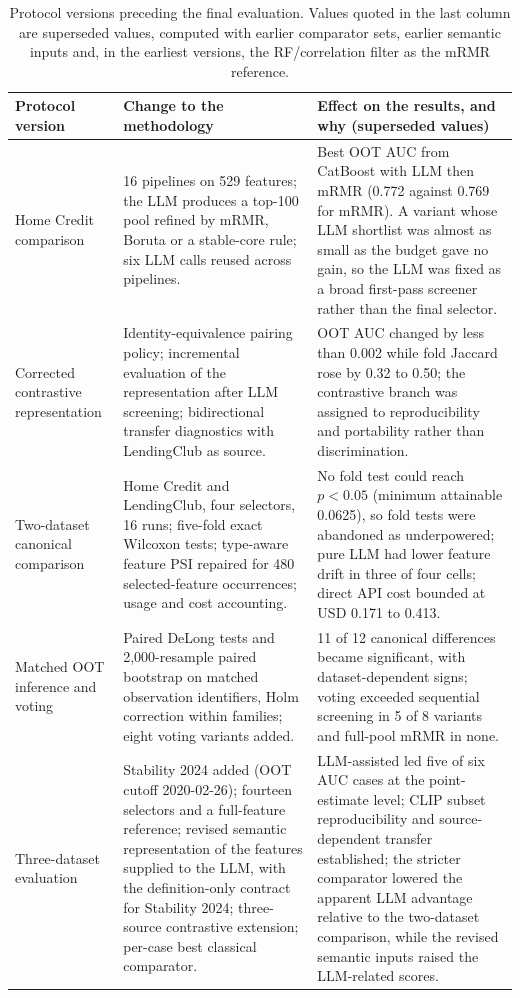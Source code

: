 \documentclass[final,5p,twocolumn]{elsarticle}
\begin{document}
\begin{table}[htbp]
\centering
\scriptsize
\setlength{\tabcolsep}{4pt}
\begin{threeparttable}
\caption{Protocol versions preceding the final evaluation. Values quoted in the last column are superseded values, computed with earlier comparator sets, earlier semantic inputs and, in the earliest versions, the RF/correlation filter as the mRMR reference.}
\label{tab:stages}
\begin{tabular}{@{}L{16mm}L{56mm}L{56mm}@{}}
\toprule
Protocol version & Change to the methodology & Effect on the results, and why (superseded values) \\
\midrule
Home Credit comparison & 16 pipelines on 529 features; the LLM produces a top-100 pool refined by mRMR, Boruta or a stable-core rule; six LLM calls reused across pipelines. & Best OOT AUC from CatBoost with LLM then mRMR (0.772 against 0.769 for mRMR). A variant whose LLM shortlist was almost as small as the budget gave no gain, so the LLM was fixed as a broad first-pass screener rather than the final selector. \\
\addlinespace
Corrected contrastive representation & Identity-equivalence pairing policy; incremental evaluation of the representation after LLM screening; bidirectional transfer diagnostics with LendingClub as source. & OOT AUC changed by less than 0.002 while fold Jaccard rose by 0.32 to 0.50; the contrastive branch was assigned to reproducibility and portability rather than discrimination. \\
\addlinespace
Two-dataset canonical comparison & Home Credit and LendingClub, four selectors, 16 runs; five-fold exact Wilcoxon tests; type-aware feature PSI repaired for 480 selected-feature occurrences; usage and cost accounting. & No fold test could reach $p<0.05$ (minimum attainable 0.0625), so fold tests were abandoned as underpowered; pure LLM had lower feature drift in three of four cells; direct API cost bounded at USD 0.171 to 0.413. \\
\addlinespace
Matched OOT inference and voting & Paired DeLong tests and 2,000-resample paired bootstrap on matched observation identifiers, Holm correction within families; eight voting variants added. & 11 of 12 canonical differences became significant, with dataset-dependent signs; voting exceeded sequential screening in 5 of 8 variants and full-pool mRMR in none. \\
\addlinespace
Three-dataset evaluation & Stability 2024 added (OOT cutoff 2020-02-26); fourteen selectors and a full-feature reference; revised semantic representation of the features supplied to the LLM, with the definition-only contract for Stability 2024; three-source contrastive extension; per-case best classical comparator. & LLM-assisted led five of six AUC cases at the point-estimate level; CLIP subset reproducibility and source-dependent transfer established; the stricter comparator lowered the apparent LLM advantage relative to the two-dataset comparison, while the revised semantic inputs raised the LLM-related scores. \\

\end{tabular}
\end{threeparttable}
\end{table}
\end{document}
